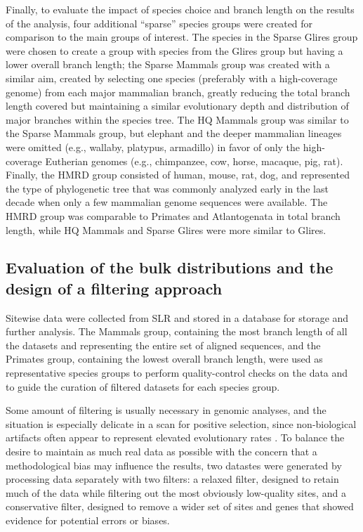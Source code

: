 Finally, to evaluate the impact of species choice and branch length on
the results of the \sw analysis, four additional ``sparse'' species
groups were created for comparison to the main groups of interest. The
species in the Sparse Glires group were chosen to create a group with
species from the Glires group but having a lower overall branch
length; the Sparse Mammals group was created with a similar aim,
created by selecting one species (preferably with a high-coverage
genome) from each major mammalian branch, greatly reducing the total
branch length covered but maintaining a similar evolutionary depth and
distribution of major branches within the species tree. The HQ Mammals
group was similar to the Sparse Mammals group, but elephant and the
deeper mammalian lineages were omitted (e.g., wallaby, platypus,
armadillo) in favor of only the high-coverage Eutherian genomes (e.g.,
chimpanzee, cow, horse, macaque, pig, rat). Finally, the HMRD group
consisted of human, mouse, rat, dog, and represented the type of
phylogenetic tree that was commonly analyzed early in the last decade
when only a few mammalian genome sequences were available. The HMRD
group was comparable to Primates and Atlantogenata in total branch
length, while HQ Mammals and Sparse Glires were more similar to
Glires.

\subsection{Evaluation of the bulk distributions and the design of a filtering approach}
\label{section_sitewise_filtering}

Sitewise data were collected from SLR and stored in a database for
storage and further analysis. The Mammals group, containing the most
branch length of all the datasets and representing the entire set of
aligned sequences, and the Primates group, containing the lowest
overall branch length, were used as representative species groups to
perform quality-control checks on the \sw data and to guide the
curation of filtered \sw datasets for each species group.

Some amount of filtering is usually necessary in genomic analyses, and
the situation is especially delicate in a scan for positive selection,
since non-biological artifacts often appear to represent elevated
evolutionary rates
\citep{MarkovaRaina2011,Schneider2009,Mallick2009}. To balance the
desire to maintain as much real data as possible with the concern that
a methodological bias may influence the results, two datastes were
generated by processing \sw data separately with two filters: a
relaxed filter, designed to retain much of the data while filtering
out the most obviously low-quality sites, and a conservative filter,
designed to remove a wider set of sites and genes that showed evidence
for potential errors or biases.

